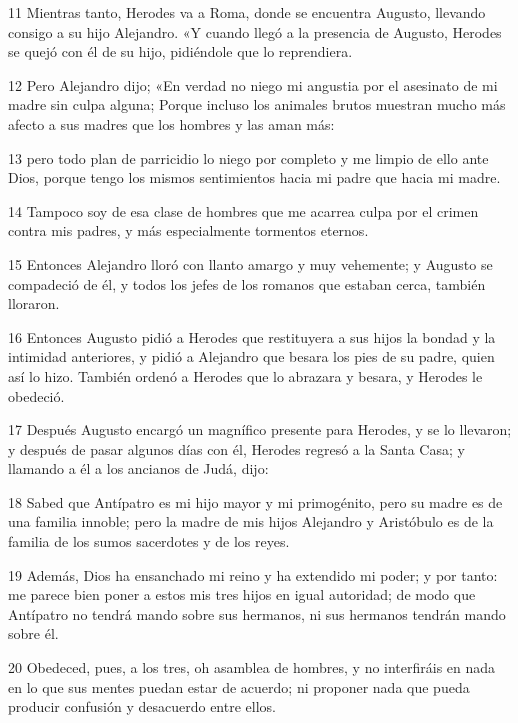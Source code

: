 \par 11 Mientras tanto, Herodes va a Roma, donde se encuentra Augusto, llevando consigo a su hijo Alejandro. «Y cuando llegó a la presencia de Augusto, Herodes se quejó con él de su hijo, pidiéndole que lo reprendiera.

\par 12 Pero Alejandro dijo; «En verdad no niego mi angustia por el asesinato de mi madre sin culpa alguna; Porque incluso los animales brutos muestran mucho más afecto a sus madres que los hombres y las aman más:

\par 13 pero todo plan de parricidio lo niego por completo y me limpio de ello ante Dios, porque tengo los mismos sentimientos hacia mi padre que hacia mi madre.

\par 14 Tampoco soy de esa clase de hombres que me acarrea culpa por el crimen contra mis padres, y más especialmente tormentos eternos.

\par 15 Entonces Alejandro lloró con llanto amargo y muy vehemente; y Augusto se compadeció de él, y todos los jefes de los romanos que estaban cerca, también lloraron.

\par 16 Entonces Augusto pidió a Herodes que restituyera a sus hijos la bondad y la intimidad anteriores, y pidió a Alejandro que besara los pies de su padre, quien así lo hizo. También ordenó a Herodes que lo abrazara y besara, y Herodes le obedeció.

\par 17 Después Augusto encargó un magnífico presente para Herodes, y se lo llevaron; y después de pasar algunos días con él, Herodes regresó a la Santa Casa; y llamando a él a los ancianos de Judá, dijo:

\par 18 Sabed que Antípatro es mi hijo mayor y mi primogénito, pero su madre es de una familia innoble; pero la madre de mis hijos Alejandro y Aristóbulo es de la familia de los sumos sacerdotes y de los reyes.

\par 19 Además, Dios ha ensanchado mi reino y ha extendido mi poder; y por tanto: me parece bien poner a estos mis tres hijos en igual autoridad; de modo que Antípatro no tendrá mando sobre sus hermanos, ni sus hermanos tendrán mando sobre él.

\par 20 Obedeced, pues, a los tres, oh asamblea de hombres, y no interfiráis en nada en lo que sus mentes puedan estar de acuerdo; ni proponer nada que pueda producir confusión y desacuerdo entre ellos.

